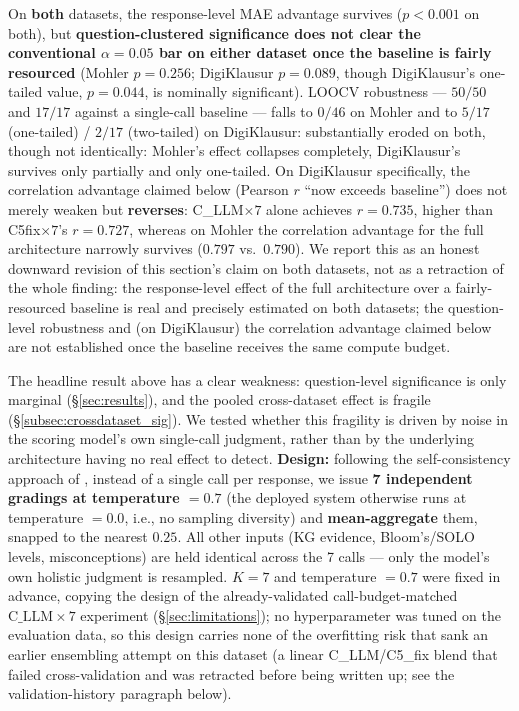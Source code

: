 \documentclass[conference]{IEEEtran}
\begin{document}
On \textbf{both} datasets, the response-level MAE advantage survives
($p<0.001$ on both), but \textbf{question-clustered significance does
not clear the conventional $\alpha=0.05$ bar on either dataset once the
baseline is fairly resourced} (Mohler $p=0.256$; DigiKlausur $p=0.089$,
though DigiKlausur's one-tailed value, $p=0.044$, is nominally
significant). LOOCV robustness --- $50/50$ and $17/17$ against a
single-call baseline --- falls to $0/46$ on Mohler and to $5/17$
(one-tailed) / $2/17$ (two-tailed) on DigiKlausur: substantially eroded
on both, though not identically: Mohler's effect collapses completely,
DigiKlausur's survives only partially and only one-tailed. On
DigiKlausur specifically, the correlation advantage claimed below
(Pearson $r$ ``now exceeds baseline'') does not merely weaken but
\textbf{reverses}: C\_LLM$\times7$ alone achieves $r=0.735$, higher than
C5fix$\times7$'s $r=0.727$, whereas on Mohler the correlation advantage
for the full architecture narrowly survives ($0.797$ vs.\ $0.790$). We
report this as an honest downward revision of this section's claim on
both datasets, not as a retraction of the whole finding: the
response-level effect of the full architecture over a fairly-resourced
baseline is real and precisely estimated on both datasets; the
question-level robustness and (on DigiKlausur) the correlation
advantage claimed below are not established once the baseline receives
the same compute budget.

The headline result above has a clear weakness: question-level
significance is only marginal (\S\ref{sec:results}), and the pooled
cross-dataset effect is fragile (\S\ref{subsec:crossdataset_sig}). We
tested whether this fragility is driven by noise in the scoring model's
own single-call judgment, rather than by the underlying architecture
having no real effect to detect. \textbf{Design:} following the
self-consistency approach of \cite{wang2023selfconsistency}, instead of
a single call per response, we issue \textbf{7 independent gradings at
temperature $=0.7$} (the deployed system otherwise runs at temperature
$=0.0$, i.e., no sampling diversity) and \textbf{mean-aggregate} them,
snapped to the nearest $0.25$. All other inputs (KG evidence, Bloom's/SOLO
levels, misconceptions) are held identical across the 7 calls --- only
the model's own holistic judgment is resampled. $K=7$ and
temperature $=0.7$ were fixed in advance, copying the design of the
already-validated call-budget-matched $\text{C\_LLM}\times7$ experiment
(\S\ref{sec:limitations}); no hyperparameter was tuned on the evaluation
data, so this design carries none of the overfitting risk that sank an
earlier ensembling attempt on this dataset (a linear C\_LLM/C5\_fix
blend that failed cross-validation and was retracted before being
written up; see the validation-history paragraph below).
\end{document}
